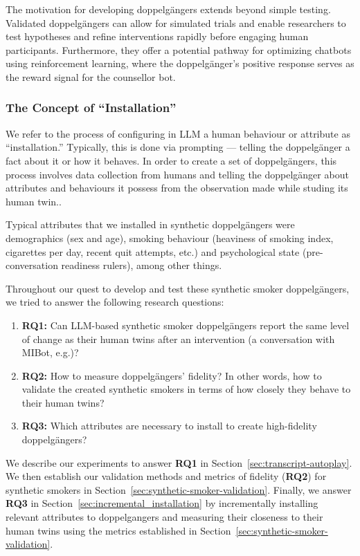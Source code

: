 The motivation for developing doppelgängers extends beyond simple testing. Validated doppelgängers can allow for simulated trials and enable researchers to test hypotheses and refine interventions rapidly before engaging human participants. Furthermore, they offer a potential pathway for optimizing chatbots using reinforcement learning, where the doppelgänger's positive response serves as the reward signal for the counsellor bot.

\subsubsection*{The Concept of ``Installation''}
We refer to the process of configuring in LLM a human behaviour or attribute as ``installation.'' Typically, this is done via prompting --- telling the doppelgänger a fact about it or how it behaves. In order to create a set of doppelgängers, this process involves data collection from humans and telling the doppelgänger about attributes and behaviours it possess from the observation made while studing its human twin..

Typical attributes that we installed in synthetic doppelgängers were demographics (sex and age), smoking behaviour (heaviness of smoking index, cigarettes per day, recent quit attempts, etc.) and psychological state (pre-conversation readiness rulers), among other things.


Throughout our quest to develop and test these synthetic smoker doppelgängers, we tried to answer the following research questions:

\begin{enumerate}
    \item \textbf{RQ1:} Can LLM-based synthetic smoker doppelgängers report the same level of change as their human twins after an intervention (a conversation with MIBot, e.g.)?

    \item \textbf{RQ2:} How to measure doppelgängers' fidelity? In other words, how to validate the created synthetic smokers in terms of how closely they behave to their human twins?

    \item \textbf{RQ3:} Which attributes are necessary to install to create high-fidelity doppelgängers?
\end{enumerate}



We describe our experiments to answer \textbf{RQ1} in Section~\ref{sec:transcript-autoplay}. We then establish our validation methods and metrics of fidelity (\textbf{RQ2}) for synthetic smokers in Section~\ref{sec:synthetic-smoker-validation}. Finally, we answer \textbf{RQ3} in Section~\ref{sec:incremental_installation} by incrementally installing relevant attributes to doppelgangers and measuring their closeness to their human twins using the metrics established in Section~\ref{sec:synthetic-smoker-validation}.


